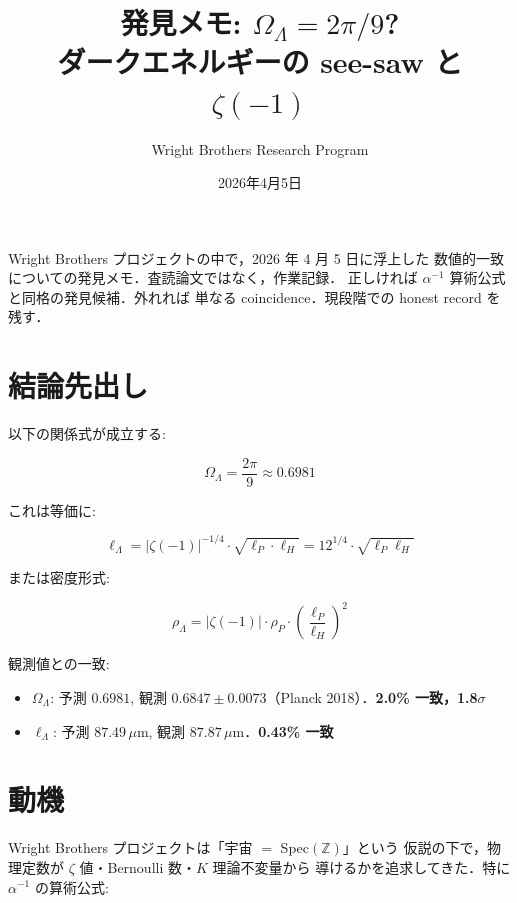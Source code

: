 \documentclass[11pt,a4paper]{article}
\title{発見メモ: $\Omega_\Lambda = 2\pi/9$?\\
\large ダークエネルギーの see-saw と $\zeta(-1)$}
\author{Wright Brothers Research Program}
\date{2026年4月5日}
\begin{document}
\maketitle

\begin{tcolorbox}[colback=yellow!10,colframe=orange!60!black,title=これは何か]
Wright Brothers プロジェクトの中で，2026 年 4 月 5 日に浮上した
数値的一致についての発見メモ．査読論文ではなく，作業記録．
正しければ $\alpha^{-1}$ 算術公式と同格の発見候補．外れれば
単なる coincidence．現段階での honest record を残す．
\end{tcolorbox}

\section{結論先出し}

以下の関係式が成立する:

\begin{equation}
\boxed{\Omega_\Lambda = \frac{2\pi}{9} \approx 0.6981}
\end{equation}

これは等価に:

\begin{equation}
\boxed{\ell_\Lambda = |\zeta(-1)|^{-1/4}\cdot\sqrt{\ell_P \cdot \ell_H} = 12^{1/4}\cdot\sqrt{\ell_P\ell_H}}
\end{equation}

または密度形式:

\begin{equation}
\boxed{\rho_\Lambda = |\zeta(-1)|\cdot\rho_P\cdot\left(\frac{\ell_P}{\ell_H}\right)^2}
\end{equation}

観測値との一致:
\begin{itemize}
\item $\Omega_\Lambda$: 予測 $0.6981$, 観測 $0.6847 \pm 0.0073$（Planck 2018）．\textbf{2.0\% 一致，1.8$\sigma$}
\item $\ell_\Lambda$: 予測 $87.49\,\mu$m, 観測 $87.87\,\mu$m．\textbf{0.43\% 一致}
\end{itemize}

\section{動機}

Wright Brothers プロジェクトは「宇宙 $=$ Spec$(\mathbb{Z})$」という
仮説の下で，物理定数が $\zeta$ 値・Bernoulli 数・$K$ 理論不変量から
導けるかを追求してきた．特に $\alpha^{-1}$ の算術公式:
\end{document}

